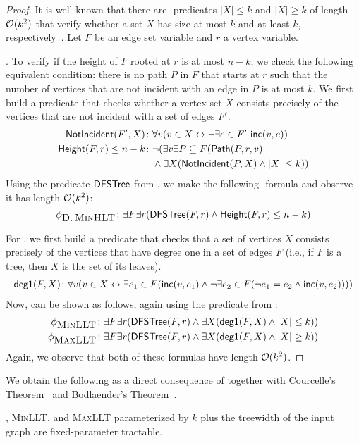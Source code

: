 \documentclass[a4paper,11pt]{article}
\begin{document}
%
\begin{proof}
    It is well-known that there are \MSOone-predicates $|X| \le k$ and $|X| \ge k$ of length ${\mathcal{O}}(k^2)$ that verify whether a set $X$ has size at most $k$ and at least $k$, respectively~\cite{BoriePT92}.
    Let $F$ be an edge set variable and $r$ a vertex variable.

    .
    To verify if the height of $F$ rooted at $r$ is at most $n - k$,
    we check the following equivalent condition: 
    there is no path $P$ in $F$ that starts at $r$ 
    such that the number of vertices that are not incident with an edge in $P$ is at most $k$.
    We first build a predicate that checks whether a vertex set $X$ consists precisely of the vertices that are not incident with a set of edges $F'$.
    \begin{align*}
        \mathsf{NotIncident}(F', X)\colon &\forall v (v \in X \leftrightarrow \neg \exists e \in F'~ \mathsf{inc}(v, e)) \\
        \mathsf{Height}(F, r) \le n-k \colon 
        &\neg (\exists v \exists P \subseteq F (\mathsf{Path}(P, r, v) \\ 
        &\land \exists X (\mathsf{NotIncident}(P, X) \land |X| \le k))
    \end{align*}
    Using the predicate $\mathsf{DFSTree}$ from ,
    we make the following \MSOtwo-formula and observe it has length ${\mathcal{O}}(k^2)$: 
    $$\phi_{\mbox{\textsc{D.\,MinHLT}}}\colon \exists F \exists r(\mathsf{DFSTree}(F, r) \land \mathsf{Height}(F, r) \le n - k)$$

    For ,
    we first build a predicate that checks that a set of vertices $X$ consists precisely of the vertices that have degree one in a set of edges $F$ (i.e., if $F$ is a tree, then $X$ is the set of its leaves).
    \begin{align*}
        \mathsf{deg1}(F, X)\colon \forall v(v \in X \leftrightarrow \exists e_1 \in F (\mathsf{inc}(v, e_1) \land \neg \exists e_2 \in F(\neg e_1 = e_2 \land \mathsf{inc}(v, e_2))))
    \end{align*}
    Now,  can be shown as follows,
    again using the predicate \msoDFSTree from :
    \begin{align*}
        \phi_{\mbox{\textsc{MinLLT}}}\colon &\exists F \exists r (\mathsf{DFSTree}(F, r) \land \exists X (\mathsf{deg1}(F, X) \land |X| \le k)) \\
        \phi_{\mbox{\textsc{MaxLLT}}}\colon &\exists F \exists r (\mathsf{DFSTree}(F, r) \land \exists X (\mathsf{deg1}(F, X) \land |X| \ge k))
    \end{align*}
    Again, we observe that both of these formulas have length ${\mathcal{O}}(k^2)$.
\end{proof}
%
We obtain the following as a direct consequence of  
together with Courcelle's Theorem~\cite{Courcelle90} 
and Bodlaender's Theorem~\cite{Bodlaender96}.
%
\begin{corollary}
    \DualMinHProb,
    \textsc{MinLLT}, and
    \textsc{MaxLLT}
    parameterized by $k$ plus 
    the treewidth of the input graph
    are fixed-parameter tractable.
\end{corollary}
\end{document}
